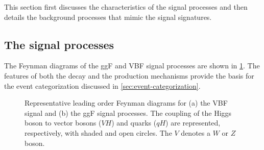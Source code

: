 This section first discusses the characteristics of the signal processes and then details the background processes that mimic the signal signatures.

\subsection{The signal processes}
\label{subsec:signal-bkg-characterisation}
The Feynman diagrams of the ggF and VBF signal processes are shown in \cref{fig:feyn:sig-wwprod}.
The features of both the \HWWdet decay and the production mechanisms provide the basis for the event categorization discussed in \cref{sec:event-categorization}. 

\captionsetup[subfloat]{captionskip=10pt}
\begin{figure}[ht]
    \caption[Feynman diagrams for the VBF and ggF signal.]{Representative leading order Feynman diagrams for (a) the VBF signal and (b) the ggF signal processes. The coupling of the Higgs boson to vector bosons ($VH$) and quarks ($qH$) are represented, respectively, with shaded and open circles. The $V$ denotes a $W$ or $Z$ boson.} 
    \label{fig:feyn:sig-wwprod}
\end{figure}
\resetcaptionoffset

